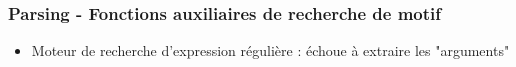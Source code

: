 \documentclass{beamer}
\begin{document}
\begin{frame}
\frametitle{Parsing - Fonctions auxiliaires de recherche de motif}
\begin{itemize}
\item Moteur de recherche d'expression régulière : échoue à extraire les "arguments"
\end{itemize}
\begin{scriptsize}

\end{scriptsize}
\end{frame}
\end{document}
